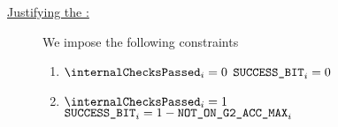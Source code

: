 \begin{description}
    \item[\underline{Justifying the \ecdataSuccessBit{}:}]
          We impose the following constraints
          \begin{enumerate}
              \item \If $\internalChecksPassed _{i}= 0$ \Then $\texttt{SUCCESS\_BIT} _{i} = 0$
              \item \If $\internalChecksPassed _{i}= 1$  \Then $\texttt{SUCCESS\_BIT}_{i} = 1 - \texttt{NOT\_ON\_G2\_ACC\_MAX} _{i}$
          \end{enumerate}
\end{description}
